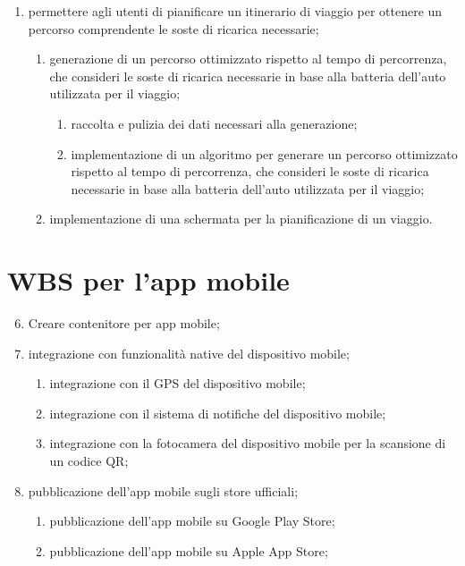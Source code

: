 \documentclass[a4paper,12pt]{article}
\begin{document}
\begin{enumerate}
\begin{enumerate}
        \begin{enumerate}
            \item creazione di una schermata per mostrare le proprie auto in carica con il rispettivo livello di batteria
            che viene aggiornato in tempo reale;
            \item implementazione della logica per ricevere e mostrare aggiornamenti in tempo reale sulle ricariche;
        \end{enumerate}
    \end{enumerate}
    \item permettere agli utenti di pianificare un itinerario di viaggio per ottenere un percorso comprendente le soste
    di ricarica necessarie;
    \begin{enumerate}
        \item generazione di un percorso ottimizzato rispetto al tempo di percorrenza, che consideri le soste di ricarica
        necessarie in base alla batteria dell'auto utilizzata per il viaggio;
        \begin{enumerate}
            \item raccolta e pulizia dei dati necessari alla generazione;
            \item implementazione di un algoritmo per generare un percorso ottimizzato rispetto al tempo di percorrenza,
            che consideri le soste di ricarica necessarie in base alla batteria dell'auto utilizzata per il viaggio;
        \end{enumerate}
        \item implementazione di una schermata per la pianificazione di un viaggio.
    \end{enumerate}
\end{enumerate}

\section{WBS per l'app mobile}
\begin{enumerate}
    \setcounter{enumi}{5}
    \item Creare contenitore per app mobile;
    \item integrazione con funzionalità native del dispositivo mobile;
    \begin{enumerate}
        \item integrazione con il GPS del dispositivo mobile;
        \item integrazione con il sistema di notifiche del dispositivo mobile;
        \item integrazione con la fotocamera del dispositivo mobile per la scansione di un codice QR;
    \end{enumerate}
    \item pubblicazione dell'app mobile sugli store ufficiali;
    \begin{enumerate}
        \item pubblicazione dell'app mobile su Google Play Store;
        \item pubblicazione dell'app mobile su Apple App Store;
    \end{enumerate}
\end{enumerate}
\end{document}
